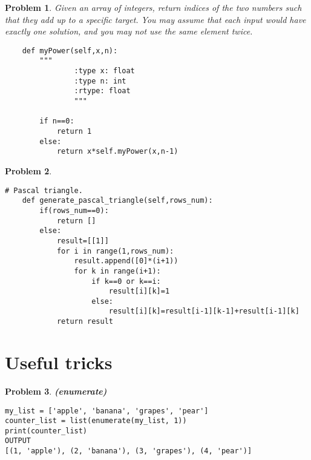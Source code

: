 \documentclass{book}
\newtheorem{problem}{Problem}[section]
\begin{document}
\begin{problem}
Given an array of integers, return indices of the two numbers such that they add up to a specific target.
You may assume that each input would have exactly one solution, and you may not use the same element twice.

\begin{verbatim}
    def myPower(self,x,n):
        """
                :type x: float
                :type n: int
                :rtype: float
                """

        if n==0:
            return 1
        else:
            return x*self.myPower(x,n-1)
\end{verbatim}
\end{problem}
\begin{problem}
\begin{verbatim}
# Pascal triangle.
    def generate_pascal_triangle(self,rows_num):
        if(rows_num==0):
            return []
        else:
            result=[[1]]
            for i in range(1,rows_num):
                result.append([0]*(i+1))
                for k in range(i+1):
                    if k==0 or k==i:
                        result[i][k]=1
                    else:
                        result[i][k]=result[i-1][k-1]+result[i-1][k]
            return result
\end{verbatim}
\end{problem}
\section{Useful tricks}
\begin{problem}\textbf{(enumerate)}

\begin{verbatim}
my_list = ['apple', 'banana', 'grapes', 'pear']
counter_list = list(enumerate(my_list, 1))
print(counter_list)
OUTPUT
[(1, 'apple'), (2, 'banana'), (3, 'grapes'), (4, 'pear')]

\end{verbatim}
\end{problem}
\end{document}
